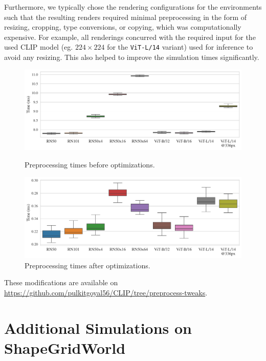 Furthermore, we typically chose the rendering configurations for the environments such that the resulting renders required minimal preprocessing in the form of resizing, cropping, type conversions, or copying, which was computationally expensive.
For example, all renderings concurred with the required input for the used CLIP model (eg. \(224 \times 224\) for the \texttt{ViT-L/14} variant) used for inference to avoid any resizing.
This also helped to improve the simulation times significantly.\\

\begin{figure}[H]
    \centering
    \includegraphics[width=\textwidth]{images/full_transform.pdf}
    \vspace{-12pt}
    \caption{Preprocessing times before optimizations.}
    \includegraphics[width=\textwidth]{images/fast_transform.pdf}
    \vspace{-12pt}
    \caption{Preprocessing times after optimizations.}
    \label{fig:preprocessing-time-improvement}
\end{figure}

These modifications are available on \url{https://github.com/pulkitgoyal56/CLIP/tree/preprocess-tweaks}.



\chapter{Additional Simulations on ShapeGridWorld}
\label{sec:sgw-semantics-additional}


